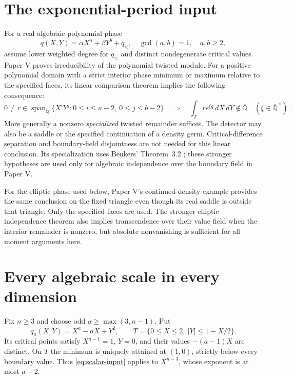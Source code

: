 \documentclass[11pt]{article}
\numberwithin{equation}{section}
\theoremstyle{definition}
\theoremstyle{remark}
\newcommand{\Qbar}{\overline{\mathbb Q}}
\begin{document}
\section{The exponential-period input}\label{sec:input}
For a real algebraic polynomial phase
\[
 q(X,Y)=\alpha X^a+\beta Y^b+q_<,
 \quad\gcd(a,b)=1,\quad a,b\ge2,
\]
assume lower weighted degree for $q_<$ and distinct nondegenerate critical
values. Paper V proves irreducibility of the polynomial twisted module.
For a positive polynomial domain with a strict interior phase minimum or
maximum relative to the specified faces, its linear comparison theorem
implies the following consequence:
\begin{equation}\label{eq:scalar-input}
 0\ne r\in\operatorname{span}_{\Qbar}
 \{X^iY^j:0\le i\le a-2,\ 0\le j\le b-2\}
 \quad\Longrightarrow\quad
 \int_T r e^{\xi q}\,dX\,dY\notin\Qbar
 \quad(\xi\in\Qbar^\times).
\end{equation}
More generally a nonzero \emph{specialized} twisted remainder suffices.
The detector may also be a saddle or the specified continuation of a density
germ. Critical-difference separation and boundary-field disjointness are not
needed for this linear conclusion. Its specialization uses Beukers'
Theorem~3.2 \cite{Beukers}; these stronger hypotheses are used only for
algebraic independence over the boundary field in Paper V.

For the elliptic phase used below, Paper V's continued-density example
provides the same conclusion on the fixed triangle even though its real
saddle is outside that triangle. Only the specified faces are used. The
stronger elliptic independence theorem also implies transcendence over
their value field when the interior remainder is nonzero, but absolute
nonvanishing is sufficient for all moment arguments here.

\section{Every algebraic scale in every dimension}
Fix $n\ge3$ and choose odd $a\ge\max(3,n-1)$. Put
\[
 q_a(X,Y)=X^a-aX+Y^2,
 \qquad T=\{0\le X\le2,\ |Y|\le1-X/2\}.
\]
Its critical points satisfy $X^{a-1}=1$, $Y=0$, and their values
$-(a-1)X$ are distinct. On $T$ the minimum is uniquely attained at $(1,0)$,
strictly below every boundary value. Thus \eqref{eq:scalar-input} applies to
$X^{n-3}$, whose exponent is at most $a-2$.
\end{document}
